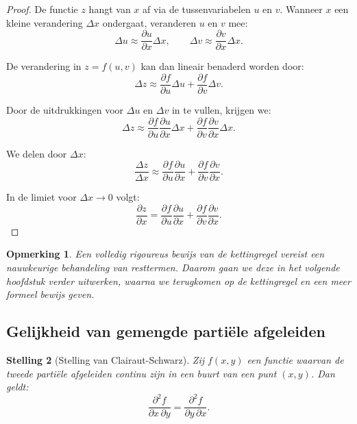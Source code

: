 \documentclass[11pt,a4paper]{article}
\newtheorem{theorem}{Stelling}[section]
\newtheorem{remark}[theorem]{Opmerking}
\begin{document}
    \begin{proof}
        De functie $z$ hangt van $x$ af via de tussenvariabelen $u$ en $v$. Wanneer $x$
        een kleine verandering $\Delta x$ ondergaat, veranderen $u$ en $v$ mee:
        \[
            \Delta u \approx \frac{\partial u}{\partial x}\Delta x,
            \qquad
            \Delta v \approx \frac{\partial v}{\partial x}\Delta x.
        \]

        De verandering in $z=f(u,v)$ kan dan lineair benaderd worden door:
        \[
            \Delta z
            \approx
            \frac{\partial f}{\partial u}\Delta u
            +
            \frac{\partial f}{\partial v}\Delta v.
        \]

        Door de uitdrukkingen voor $\Delta u$ en $\Delta v$ in te vullen, krijgen we:
        \[
            \Delta z
            \approx
            \frac{\partial f}{\partial u}\frac{\partial u}{\partial x}\Delta x
            +
            \frac{\partial f}{\partial v}\frac{\partial v}{\partial x}\Delta x.
        \]

        We delen door $\Delta x$:
        \[
            \frac{\Delta z}{\Delta x}
            \approx
            \frac{\partial f}{\partial u}\frac{\partial u}{\partial x}
            +
            \frac{\partial f}{\partial v}\frac{\partial v}{\partial x}.
        \]

        In de limiet voor $\Delta x \to 0$ volgt:
        \[
            \frac{\partial z}{\partial x}
            =
            \frac{\partial f}{\partial u}\frac{\partial u}{\partial x}
            +
            \frac{\partial f}{\partial v}\frac{\partial v}{\partial x}.
        \]
    \end{proof}

    \begin{remark}
        Een volledig rigoureus bewijs van de kettingregel vereist een nauwkeurige behandeling
        van resttermen. Daarom gaan we deze in het volgende hoofdstuk verder uitwerken, waarna we terugkomen op de kettingregel en een meer formeel bewijs geven.
    \end{remark}

    \subsection{Gelijkheid van gemengde partiële afgeleiden}

    \begin{theorem}[Stelling van Clairaut-Schwarz]
Zij $f(x,y)$ een functie waarvan de tweede partiële afgeleiden continu zijn in een buurt
van een punt $(x,y)$. Dan geldt:
\[
    \frac{\partial^2 f}{\partial x\,\partial y}
    =
    \frac{\partial^2 f}{\partial y\,\partial x}.
\]
    \end{theorem}
\end{document}
